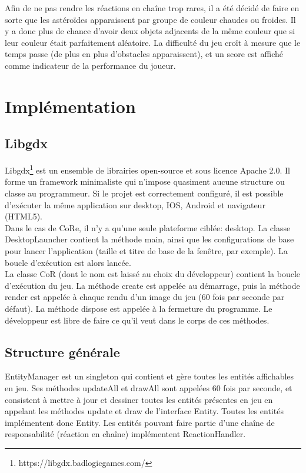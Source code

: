 \documentclass[11pt,a4paper,twoside,svgnames]{article}
\begin{document}
Afin de ne pas rendre les réactions en chaîne trop rares, il a été décidé de faire en sorte que les astéroïdes apparaissent par groupe de couleur chaudes ou froides. Il y a donc plus de chance d'avoir deux objets adjacents de la même couleur que si leur couleur était parfaitement aléatoire. La difficulté du jeu croît à mesure que le temps passe (de plus en plus d'obstacles apparaissent), et un score est affiché comme indicateur de la performance du joueur.

\clearpage

\section{Implémentation}
\subsection{Libgdx}
Libgdx\footnote{https://libgdx.badlogicgames.com/} est un ensemble de librairies open-source et sous licence Apache 2.0. Il forme un framework minimaliste qui n'impose quasiment aucune structure ou classe au programmeur. Si le projet est correctement configuré, il est possible d'exécuter la même application sur desktop, IOS, Android et navigateur (HTML5).\\

Dans le cas de CoRe, il n'y a qu'une seule plateforme ciblée: desktop. La classe DesktopLauncher contient la méthode main, ainsi que les configurations de base pour lancer l'application (taille et titre de base de la fenêtre, par exemple). La boucle d'exécution est alors lancée.\\

La classe CoR (dont le nom est laissé au choix du développeur) contient la boucle d'exécution du jeu. La méthode create est appelée au démarrage, puis la méthode render est appelée à chaque rendu d'un image du jeu (60 fois par seconde par défaut). La méthode dispose est appelée à la fermeture du programme. Le développeur est libre de faire ce qu'il veut dans le corps de ces méthodes.

\subsection{Structure générale}
EntityManager est un singleton qui contient et gère toutes les entités affichables en jeu. Ses méthodes updateAll et drawAll sont appelées 60 fois par seconde, et consistent à mettre à jour et dessiner toutes les entités présentes en jeu en appelant les méthodes update et draw de l'interface Entity. Toutes les entités implémentent donc Entity. Les entités pouvant faire partie d'une chaîne de responsabilité (réaction en chaîne) implémentent ReactionHandler.\\
\end{document}
